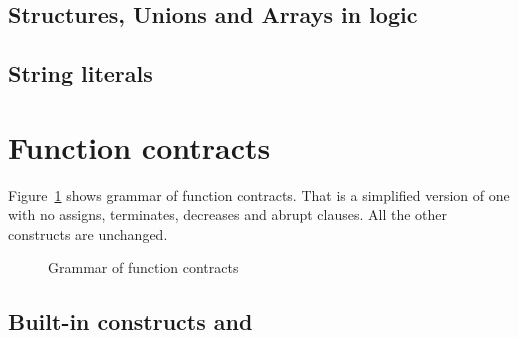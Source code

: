 \nodiff


\subsection{Structures, Unions and Arrays in logic}



\subsection{String literals}

\nodiff


\section{Function contracts}
\label{sec:fn-behavior}


Figure~\ref{fig:gram:contracts} shows grammar of function contracts. That is a
simplified version of \acsl one with no assigns, terminates, decreases and
abrupt clauses. All the other constructs are unchanged.
\begin{figure}[htbp]
  \begin{cadre}
      
   \end{cadre}
    \caption{Grammar of function contracts}
  \label{fig:gram:contracts}
\end{figure}


\subsection{Built-in constructs %
  \texorpdfstring{\old}{\textbackslash{}old} %
 and \texorpdfstring{\result}{\textbackslash{}result}}

